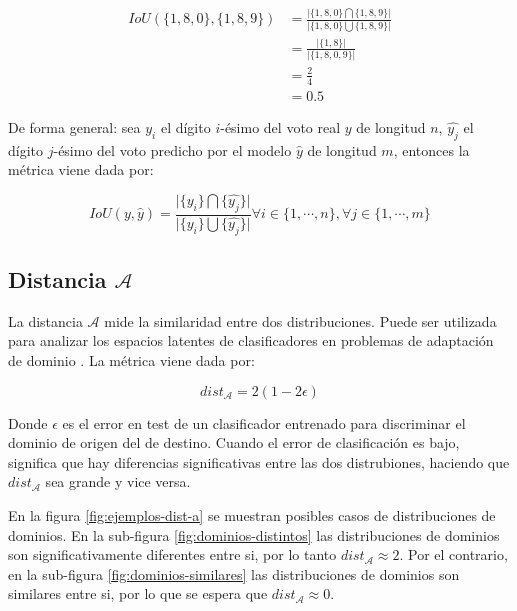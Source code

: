 \begin{align}
    IoU(\{1, 8, 0\}, \{1, 8, 9\}) & = \frac{\lvert\{1, 8, 0\} \bigcap \{1, 8, 9\}\rvert}{\lvert\{1, 8, 0\} \bigcup \{1, 8, 9\}\rvert} \nonumber \\
                                  & = \frac{\lvert\{1, 8\}\rvert}{\lvert\{1, 8, 0, 9\}\rvert}                                         \nonumber \\
                                  & = \frac{2}{4}                                                                     \nonumber                 \\
                                  & = 0.5
\end{align}

De forma general: sea $y_{i}$ el d\'igito $i$-\'esimo del voto real $y$ de longitud $n$, $\hat{y_{j}}$ el d\'igito
$j$-\'esimo del voto predicho por el modelo $\hat{y}$ de longitud $m$, entonces la m\'etrica viene dada por:

\begin{equation}
    IoU(y, \hat{y}) = \frac{\lvert \{y_{i}\} \bigcap \{\hat{y_{j}}\}\rvert}{\lvert \{y_{i}\} \bigcup \{\hat{y_{j}}\}\rvert} \forall i \in \{1, \cdots, n\}, \forall j \in \{1, \cdots, m\}
\end{equation}

\subsection{Distancia $\mathcal{A}$}

La distancia $\mathcal{A}$ mide la similaridad entre dos distribuciones. Puede ser utilizada para analizar los espacios
latentes de clasificadores en problemas de adaptaci\'on de dominio \parencite{ben2006analysis}. La m\'etrica viene dada por:

\begin{equation}
    dist_\mathcal{A} = 2 (1-2\epsilon)
\end{equation}

Donde $\epsilon$ es el error en test de un clasificador entrenado para discriminar el dominio de origen del de destino.
Cuando el error de clasificaci\'on es bajo, significa que hay diferencias significativas entre las dos distrubiones,
haciendo que $dist_\mathcal{A}$ sea grande y vice versa.

En la figura \ref{fig:ejemplos-dist-a} se muestran posibles casos de distribuciones de dominios. En la sub-figura
\ref{fig:dominios-distintos} las distribuciones de dominios son significativamente diferentes entre si, por lo tanto
$dist_\mathcal{A} \approx 2$. Por el contrario, en la sub-figura \ref{fig:dominios-similares} las distribuciones de
dominios son similares entre si, por lo que se espera que $dist_\mathcal{A} \approx 0$.

